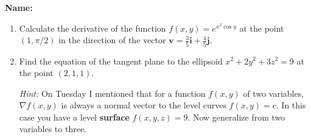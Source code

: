 \documentclass[12pt]{article}
\renewcommand{\i}{\mathbf{i}}
\renewcommand{\j}{\mathbf{j}}
\begin{document}
{\bf \Large Name:}
\thispagestyle{fancy}

 \begin{enumerate}
 \item Calculate the derivative of the function $f(x,y)=e^{x^2\cos y}$ at the point $(1,\pi/2)$ in the direction of the vector $\mathbf{v} = \frac{3}{5}\i +\frac{4}{5}\j$.

\vspace{3.25in}

 \item Find the equation of the tangent plane to the ellipsoid $x^2+2y^2+3z^2=9$ at the point $(2,1,1)$.

{\em Hint:} On Tuesday I mentioned that for a function $f(x,y)$ of two variables, $\nabla f(x,y)$ is always a normal vector to the level curves $f(x,y)=c$. In this case you have a level {\bf surface} $f(x,y,z)=9$. Now generalize from two variables to three.


 \end{enumerate}
\end{document}
